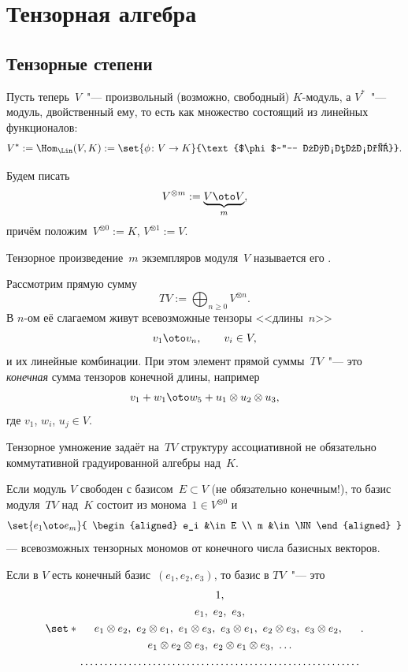 \section{Тензорная алгебра}

\subsection{Тензорные степени}

Пусть теперь~$V$~"--- произвольный (возможно, свободный) $K$-модуль, а $V^*$~"--- модуль, двойственный ему, то есть как множество состоящий из линейных функционалов:
\[
	V^* :=
	\Hom_{\Lin}(V, K) :=
	\set{\phi \colon V \to K}{\text{$\phi$~"--- линейная}}
	.
\]

Будем писать
\[
	V^{\otimes m} :=
	\underbrace{V \oto V}_{m}
	,
\]
причём положим~$V^{\otimes 0} := K$, $V^{\otimes 1} := V$.

Тензорное произведение~$m$ экземпляров модуля~$V$ называется его .

Рассмотрим прямую сумму
\[
	TV :=
	\bigoplus_{n \geq 0}
	V^{\otimes n}
	.
\]
В $n$-ом её слагаемом живут всевозможные тензоры <<длины~$n$>>
\[
	v_1 \oto v_n,
	\qquad
	v_i \in V,
\]
и их линейные комбинации. При этом элемент прямой суммы~$TV$~"--- это \emph{конечная} сумма тензоров конечной длины, например
\[
	v_1 + w_1 \oto w_5 + u_1 \otimes u_2 \otimes u_3
	,
\]
где $v_1$, $w_i$, $u_j \in V$.

Тензорное умножение задаёт на~$TV$ структуру ассоциативной не обязательно коммутативной градуированной алгебры над~$K$.

Если модуль $V$ свободен с базисом~$E \subset V$ (не обязательно конечным!), то базис модуля~$TV$ над~$K$ состоит из монома~$1 \in V^{\otimes 0}$ и
\[
	\set{e_1 \oto e_m}{
		\begin{aligned}
			e_i &\in E
			\\
			m &\in \NN
		\end{aligned}
	}
\]
--- всевозможных тензорных мономов от конечного числа базисных векторов.

\begin{example}
	Если в $V$ есть конечный базис~$(e_1, e_2, e_3)$, то базис в $TV$~"--- это
	\[
		\set*{
			\begin{gathered}
				1,\\
				e_1,\ e_2,\ e_3,
				\\
				e_1 \otimes e_2,\ 
				e_2 \otimes e_1,\   
				e_1 \otimes e_3,\   
				e_3 \otimes e_1,\   
				e_2 \otimes e_3,\   
				e_3 \otimes e_2,\   
				\\
				e_1 \otimes e_2 \otimes e_3,\ 
				e_2 \otimes e_1 \otimes e_3,\ 
				\dots
				\\
				\hbox to 9cm {\dotfill}
			\end{gathered}
		}
		.
	\]
\end{example}

